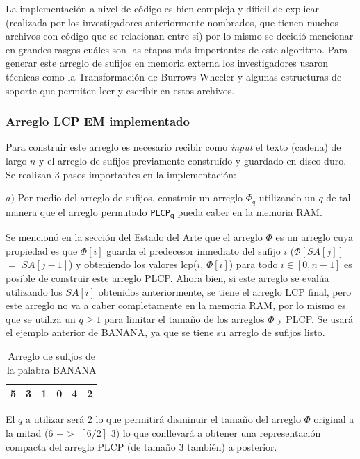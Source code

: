 La implementación a nivel de código es bien compleja y díficil de explicar (realizada por los investigadores anteriormente nombrados, que tienen muchos archivos con código que se relacionan entre sí) por lo mismo se decidió mencionar en grandes rasgos cuáles son las etapas más importantes de este algoritmo. Para generar este arreglo de sufijos en memoria externa los investigadores usaron técnicas como la Transformación de Burrows-Wheeler y algunas estructuras de soporte que permiten leer y escribir en estos archivos.

\subsubsection{Arreglo LCP EM implementado}

Para construir este arreglo es necesario recibir como \textit{input} el texto (cadena) de largo $n$ y el arreglo de sufijos previamente construído y guardado en disco duro. Se realizan 3 pasos importantes en la implementación:

$a)$ Por medio del arreglo de sufijos, construir un arreglo $\Phi_{q}$ utilizando un $q$ de tal manera que el arreglo permutado \texttt{PLCP\textsubscript{q}} pueda caber en la memoria RAM.

Se mencionó en la sección del Estado del Arte que el arreglo $\Phi$ es un arreglo cuya propiedad es que $\Phi[i]$ guarda el predecesor inmediato del sufijo $i$ ($\Phi[SA[j]]$ $=$ $SA[j-1]$) y obteniendo los valores lcp($i$, $\Phi[i]$) para todo $i \in [0,n-1]$ es posible de construir este arreglo PLCP. Ahora bien, si este arreglo se evalúa utilizando los $SA[i]$ obtenidos anteriormente, se tiene el arreglo LCP final, pero este arreglo no va a caber completamente en la memoria RAM, por lo mismo es que se utiliza un $q \geq 1$ para limitar el tamaño de los arreglos $\Phi$ y PLCP. Se usará el ejemplo anterior de BANANA, ya que se tiene su arreglo de sufijos listo.

\begin{table}[!htb]
\centering
\begin{tabular}{|c|c|c|c|c|c|}
\hline
5 & 3 & 1 & 0 & 4 & 2 \\ \hline
\end{tabular}
\caption{Arreglo de sufijos de la palabra BANANA}
\end{table}

El $q$ a utilizar será 2 lo que permitirá disminuir el tamaño del arreglo $\Phi$ original a la mitad (6 $->$ $\left \lceil{6/2}\right \rceil$ 3) lo que conllevará a obtener una representación compacta del arreglo PLCP (de tamaño 3 también) a posterior.

